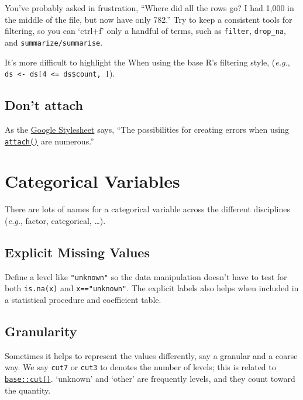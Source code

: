 \documentclass[
]{book}
\begin{document}
You've probably asked in frustration, ``Where did all the rows go? I had 1,000 in the middle of the file, but now have only 782.'' Try to keep a consistent tools for filtering, so you can `ctrl+f' only a handful of terms, such as
\texttt{filter},
\texttt{drop\_na}, and
\texttt{summarize/summarise}.

It's more difficult to highlight the When using the base R's filtering style, (\emph{e.g.}, \texttt{ds\ \textless{}-\ ds{[}4\ \textless{}=\ ds\$count,\ {]}}).

\hypertarget{style-attach}{%
\subsection{Don't attach}\label{style-attach}}

As the \href{https://google.github.io/styleguide/Rguide.html\#dont-use-attach}{Google Stylesheet} says, ``The possibilities for creating errors when using \href{https://stat.ethz.ch/R-manual/R-devel/library/base/html/attach.html}{\texttt{attach()}} are numerous.''

\hypertarget{style-factor}{%
\section{Categorical Variables}\label{style-factor}}

There are lots of names for a categorical variable across the different disciplines (\emph{e.g.}, factor, categorical, \ldots).

\hypertarget{style-factor-unknown}{%
\subsection{Explicit Missing Values}\label{style-factor-unknown}}

Define a level like \texttt{"unknown"} so the data manipulation doesn't have to test for both \texttt{is.na(x)} and \texttt{x=="unknown"}. The explicit labels also helps when included in a statistical procedure and coefficient table.

\hypertarget{style-factor-granularity}{%
\subsection{Granularity}\label{style-factor-granularity}}

Sometimes it helps to represent the values differently, say a granular and a coarse way. We say \texttt{cut7} or \texttt{cut3} to denotes the number of levels; this is related to \href{https://stat.ethz.ch/R-manual/R-devel/library/base/html/cut.html}{\texttt{base::cut()}}. `unknown' and `other' are frequently levels, and they count toward the quantity.
\end{document}
